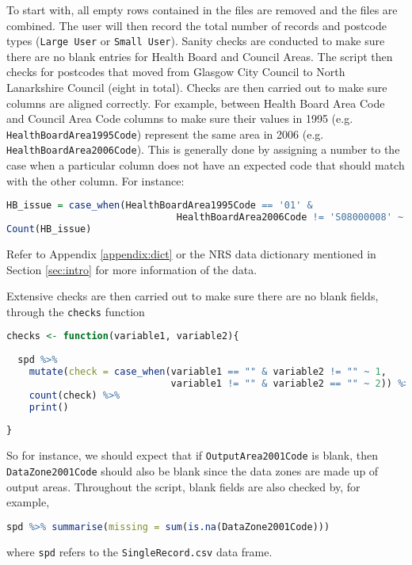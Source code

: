 \documentclass[12pt]{article}
\begin{document}
To start with, all empty rows contained in the files
are removed and the files are combined. The user will then
record the total number of records and postcode types (\texttt{Large User} or \texttt{Small User}).
Sanity checks are conducted to make sure there are
no blank entries for Health Board and Council Areas.
The script then checks for postcodes that moved
from Glasgow City Council to North Lanarkshire Council
(eight in total).
Checks are then carried out to make sure columns are
aligned correctly. For example, between Health Board Area
Code and Council Area Code columns to make sure their values in 1995 (e.g. \texttt{HealthBoardArea1995Code}) represent the same area in 2006 (e.g. \texttt{HealthBoardArea2006Code}). This is generally done
by assigning a number to the case when a particular
column does not have an expected code that should match
with the other column. For instance:
\begin{lstlisting}[language=R,frame=single]
HB_issue = case_when(HealthBoardArea1995Code == '01' & 
                              HealthBoardArea2006Code != 'S08000008' ~ 1)
Count(HB_issue)
\end{lstlisting} 
Refer to Appendix \ref{appendix:dict} or the NRS
data dictionary mentioned in Section \ref{sec:intro}
for more information of the data.
 
 Extensive checks are then carried
out to make sure there are no blank fields, through the \texttt{checks} function

\begin{lstlisting}[language=R,frame=single]
checks <- function(variable1, variable2){
  
  spd %>% 
    mutate(check = case_when(variable1 == "" & variable2 != "" ~ 1, 
                             variable1 != "" & variable2 == "" ~ 2)) %>% 
    count(check) %>% 
    print()
  
}
\end{lstlisting}
So for instance, we should expect that
if \texttt{OutputArea2001Code} is blank, then\\
\texttt{DataZone2001Code} should also be blank since
the data zones are made up of output areas. Throughout
the script, blank fields are also checked by, for example,

\begin{lstlisting}[language=R]
spd %>% summarise(missing = sum(is.na(DataZone2001Code)))
\end{lstlisting}
where \texttt{spd} refers to the \texttt{SingleRecord.csv}
data frame.
\end{document}
